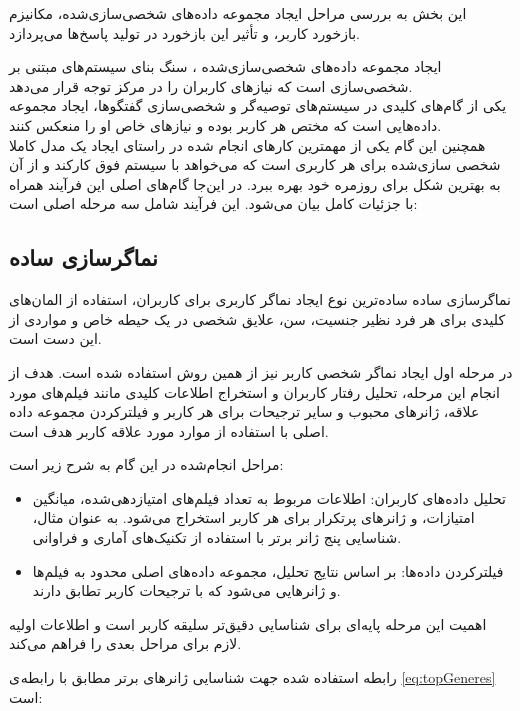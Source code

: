\begin{enumerate}
این بخش به بررسی مراحل ایجاد مجموعه داده‌های شخصی‌سازی‌شده، مکانیزم بازخورد کاربر، و تأثیر این بازخورد در تولید پاسخ‌ها می‌پردازد.

ایجاد مجموعه داده‌های شخصی‌سازی‌شده%
، سنگ بنای سیستم‌های مبتنی بر شخصی‌سازی است که نیازهای کاربران را در مرکز توجه قرار می‌دهد. \\
یکی از گام‌های کلیدی در سیستم‌های توصیه‌گر و شخصی‌سازی گفتگوها، ایجاد مجموعه داده‌هایی است که مختص هر کاربر بوده و نیازهای خاص او را منعکس کنند. \\
همچنین این گام یکی از مهمترین کارهای انجام شده در راستای ایجاد یک مدل کاملا شخصی سازی‌شده برای هر کاربری است که می‌خواهد با سیستم فوق کارکند و از آن به بهترین شکل برای روزمره خود بهره ببرد.
در این‌جا گام‌های اصلی این فرآیند همراه با جزئیات کامل بیان می‌شود. این فرآیند شامل سه مرحله اصلی است:

\subsection{نماگر‌سازی ساده}
نماگر‌سازی ساده%
 ساده‌ترین نوع ایجاد نماگر کاربری برای کاربران، استفاده از المان‌های کلیدی برای هر فرد نظیر جنسیت، سن، علایق شخصی در یک حیطه خاص و مواردی از این دست است.

در مرحله اول ایجاد نماگر شخصی کاربر نیز از همین روش استفاده شده است.
هدف از انجام این مرحله، تحلیل رفتار کاربران و استخراج اطلاعات کلیدی مانند فیلم‌های مورد علاقه، ژانرهای محبوب و سایر ترجیحات برای هر کاربر و فیلترکردن مجموعه داده اصلی با استفاده از موارد مورد علاقه کاربر هدف است. 


مراحل انجام‌شده در این گام به شرح زیر است:\\
\begin{itemize}
\item
تحلیل داده‌های کاربران: اطلاعات مربوط به تعداد فیلم‌های امتیازدهی‌شده، میانگین امتیازات، و ژانرهای پرتکرار برای هر کاربر استخراج می‌شود. به عنوان مثال، شناسایی پنج ژانر برتر با استفاده از تکنیک‌های آماری و فراوانی.
\item
فیلترکردن داده‌ها: بر اساس نتایج تحلیل، مجموعه داده‌های اصلی محدود به فیلم‌ها و ژانرهایی می‌شود که با ترجیحات کاربر تطابق دارند.
\end{itemize}

اهمیت این مرحله پایه‌ای برای شناسایی دقیق‌تر سلیقه کاربر است و اطلاعات اولیه لازم برای مراحل بعدی را فراهم می‌کند.

رابطه استفاده شده جهت شناسایی ژانرهای برتر مطابق با رابطه ی %
\ref{eq:topGeneres} 
 است:


\end{enumerate}

